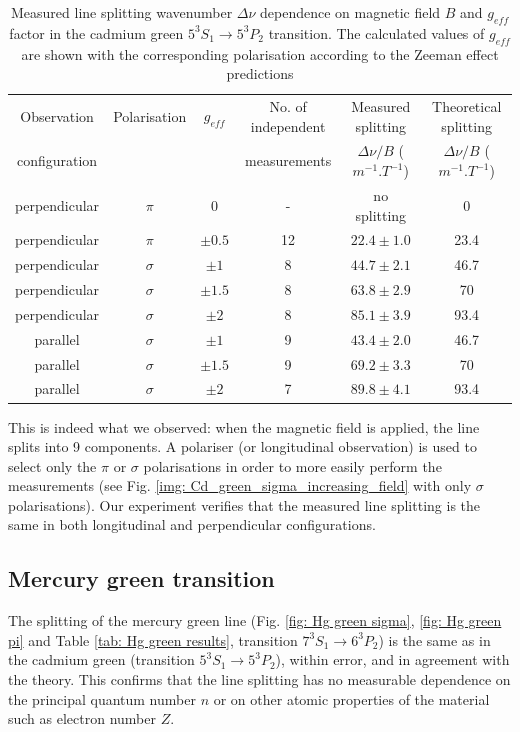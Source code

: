 \documentclass[11pt]{article}
\begin{document}
\begin{table}[h!]
    \centering
    \begin{tabular}{c|ccccc}
    \toprule
        Observation & Polarisation  & \( g_{eff} \) & No. of independent & Measured splitting  & Theoretical splitting \\
        configuration & & & measurements & $\Delta \nu / B$ ($\si{m^{-1}.T^{-1}}$) & $\Delta \nu / B$ ($\si{m^{-1}.T^{-1}}$) \\
    \midrule
        perpendicular & \( \pi \) & 0 & - & no splitting & 0\\
        perpendicular & \( \pi \) & $\pm 0.5$ & 12 & $22.4 \pm 1.0$ & 23.4\\
        perpendicular & \( \sigma \) & $\pm 1$ & 8 & $44.7 \pm 2.1$ & 46.7\\
        perpendicular & \( \sigma \) & $\pm 1.5$ & 8 & $63.8 \pm 2.9$ & 70\\
        perpendicular & \( \sigma \) & $\pm 2$ & 8 & $85.1 \pm 3.9$ & 93.4\\
        parallel & \( \sigma \) & $\pm 1$ & 9 & $43.4 \pm 2.0$ & 46.7\\
        parallel & \( \sigma \) & $\pm 1.5$ & 9 & $69.2 \pm 3.3$ & 70\\
        parallel & \( \sigma \) & $\pm 2$ & 7 & $89.8 \pm 4.1$ & 93.4\\
    \bottomrule
  \end{tabular}
    \captionsetup{justification=centering}
  \caption{Measured line splitting wavenumber $\Delta \nu$ dependence on magnetic field $B$ and $g_{eff}$ factor in the cadmium green $5^3 S_1\rightarrow 5^3 P_2$ transition. The calculated values of \(g_{eff}\) are shown with the corresponding polarisation according to the Zeeman effect predictions}
  \label{tab: Cd green g_eff}
\end{table}
This is indeed what we observed: when the magnetic field is applied, the line splits into 9 components. A polariser (or longitudinal observation) is used to select only the $\pi$ or $\sigma$ polarisations in order to more easily perform the measurements (see Fig. \ref{img: Cd_green_sigma_increasing_field} with only $\sigma$ polarisations). Our experiment verifies that the measured line splitting is the same in both longitudinal and perpendicular configurations. 

\subsection{Mercury green transition} \label{sec: Hg green}
The splitting of the mercury green line (Fig. \ref{fig: Hg green sigma}, \ref{fig: Hg green pi} and Table \ref{tab: Hg green results}, transition $7^3 S_1 \rightarrow 6^3P_2$) is the same as in the cadmium green (transition $5^3 S_1 \rightarrow 5^3P_2$), within error, and in agreement with the theory. This confirms that the line splitting has no measurable dependence on the principal quantum number $n$ or on other atomic properties of the material such as electron number $Z$. 
\end{document}
